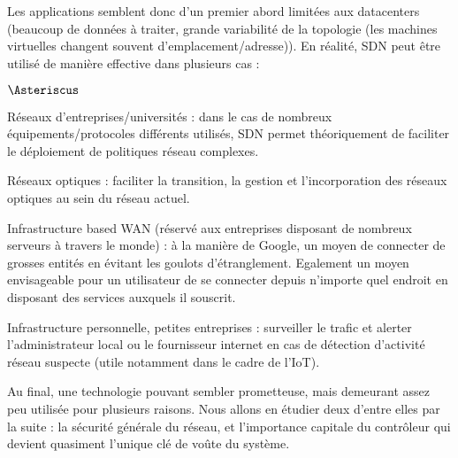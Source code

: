 Les applications semblent donc d'un premier abord limitées aux datacenters (beaucoup de données à traiter, grande variabilité de la topologie (les machines virtuelles changent souvent d'emplacement/adresse)). En réalité, SDN peut être utilisé de manière effective dans plusieurs cas :

\begin{list}{$\Asteriscus$}{}
\item Réseaux d'entreprises/universités : dans le cas de nombreux équipements/protocoles différents utilisés, SDN permet théoriquement de faciliter le déploiement de politiques réseau complexes.
\item Réseaux optiques : faciliter la transition, la gestion et l'incorporation des réseaux optiques au sein du réseau actuel.
\item Infrastructure based WAN (réservé aux entreprises disposant de nombreux serveurs à travers le monde) : à la manière de Google, un moyen de connecter de grosses entités en évitant les goulots d'étranglement. Egalement un moyen envisageable pour un utilisateur de se connecter depuis n'importe quel endroit en disposant des services auxquels il souscrit.
\item Infrastructure personnelle, petites entreprises : surveiller le trafic et alerter l'administrateur local ou le fournisseur internet en cas de détection d'activité réseau suspecte (utile notamment dans le cadre de l'IoT).\\
\end{list}

Au final, une technologie pouvant sembler prometteuse, mais demeurant assez peu utilisée pour plusieurs raisons. Nous allons en étudier deux d'entre elles par la suite : la sécurité générale du réseau, et l'importance capitale du contrôleur qui devient quasiment l'unique clé de voûte du système.